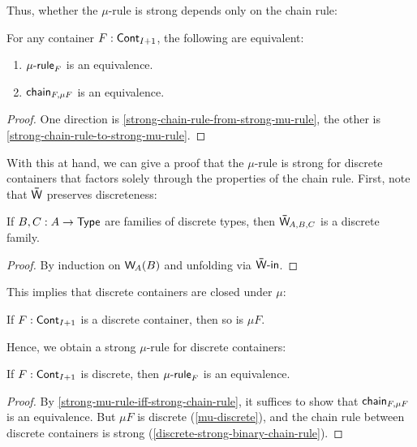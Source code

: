 Thus, whether the \( \mu \)-rule is strong depends only on the chain rule:
\begin{theorem}\label{strong-mu-rule-iff-strong-chain-rule}
  For any container \( F : \operatorname{\mathsf{Cont}}_{I + 1} \), the following are equivalent:
  \begin{enumerate}
    \item \( \operatorname{\mathsf{\mu-rule}}_F \) is an equivalence.
    \item \( \operatorname{\mathsf{chain}}_{F,{\mu F}} \) is an equivalence.
  \end{enumerate}
  \begin{proof}
    One direction is \autoref{strong-chain-rule-from-strong-mu-rule},
    the other is \autoref{strong-chain-rule-to-strong-mu-rule}.
  \end{proof}
\end{theorem}

With this at hand, we can give a proof that the \( \mu \)-rule is strong for discrete containers
that factors solely through the properties of the chain rule.
First, note that \( \WPath \) preserves discreteness:
\begin{lemma}
  If \( B, C : A \to \operatorname{\mathsf{Type}} \) are families of discrete types,
  then \( \WPath_{A,B,C} \) is a discrete family.
  \begin{proof}
    By induction on \( \W_{A}(B) \) and unfolding via \( \operatorname{\mathsf{\bar{W}-in}} \).
  \end{proof}
\end{lemma}
This implies that discrete containers are closed under \( \mu \):
\begin{lemma}\label{mu-discrete}
  If \( F : \operatorname{\mathsf{Cont}}_{I + 1} \) is a discrete container, then so is \( \mu F \).
\end{lemma}
Hence, we obtain a strong \( \mu \)-rule for discrete containers:
\begin{proposition}[note={\cite[{Proposition 8.1}]{AbbottEtAl2005DataDifferentiating}}]
  If \( F : \operatorname{\mathsf{Cont}}_{I + 1} \) is discrete, then \( \operatorname{\mathsf{\mu-rule}}_F \) is an equivalence.
  \begin{proof}
    By \autoref{strong-mu-rule-iff-strong-chain-rule}, it suffices to show that \( \operatorname{\mathsf{chain}}_{F,\mu F} \) is an equivalence.
    But \( \mu F \) is discrete (\autoref{mu-discrete}), and the chain rule between discrete containers is strong (\autoref{discrete-strong-binary-chain-rule}).
  \end{proof}
\end{proposition}
